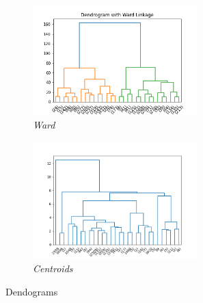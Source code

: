 \begin{figure}[h!]
\begin{subfigure}{0.49\textwidth}
        \centering
        \includegraphics[width=0.7\textwidth]{img/clustering/ward.png}
        \caption{\emph{Ward}}
        \label{fig:ward_img}
    \end{subfigure}
    \begin{subfigure}{0.49\textwidth}
         \centering
         \includegraphics[width=0.7\textwidth]{img/clustering/centroid.png}
         \caption{\emph{Centroids}}
         \label{fig:centr_img}
     \end{subfigure}
     \caption{Dendograms}
    \label{fig:dendograms}
\end{figure}

